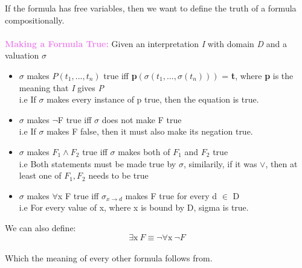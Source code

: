 \documentclass[a4paper,10pt]{article}
\begin{document}
\indent If the formula has free variables, then we want to define the truth of a formula compositionally. \\\\
\noindent \textcolor{Violet}{\textbf{Making a Formula True:}} Given an interpretation \emph{I} with domain \emph{D} and a valuation {$\sigma$}
\renewcommand{\labelitemi}{\textperiodcentered}
\begin{itemize}
\item $\sigma$ makes $P(t_{1},...,t_{n})$ true iff \textbf{p}$(\sigma(t_{1},...,\sigma(t_{n})))$ = \textbf{t}, where \textbf{p} is the meaning that \emph{I} gives \emph{P} \\ 
i.e If $\sigma$ makes every instance of p true, then the equation is true. 
\item $\sigma$ makes $\neg$F true iff $\sigma$ does not make F true \\ 
i.e If $\sigma$ makes F false, then it must also make its negation true. 
\item $\sigma$ makes $F_{1} \land F_{2}$ true iff $\sigma$ makes both of $F_{1}$ and $F_{2}$ true \\
i.e Both statements must be made true by $\sigma$, similarily, if it was $\lor$, then at least one of $F_{1}, F_{2}$ needs to be true
\item $\sigma$ makes $\forall$x F true iff $\sigma_{x \rightarrow d}$ makes F true for every d $\in$ D \\ 
i.e For every value of x, where x is bound by D, sigma is true.\\
\end{itemize} 

 We can also define: \\
\begin{equation*}
\exists \textrm{x} \   F \equiv \neg \forall \textrm{x} \  \neg F
\end{equation*}
\\
\indent Which the meaning of every other formula follows from. 
\newpage 
\end{document}

